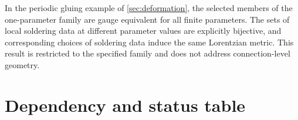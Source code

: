 \documentclass[11pt,a4paper]{article}
\theoremstyle{definition}
\theoremstyle{remark}
\begin{document}
In the periodic gluing example of \cref{sec:deformation}, the selected
members of the one-parameter family are gauge equivalent for all finite parameters.  The
sets of local soldering data at different parameter values are explicitly
bijective, and corresponding choices of soldering data induce the same Lorentzian metric.  This
result is restricted to the specified family and does not address
connection-level geometry.

\appendix
\clearpage
\section{Dependency and status table}
\label{app:status}
\end{document}
